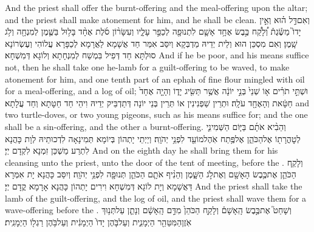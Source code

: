 {And the priest shall offer the burnt-offering and the meal-offering upon the altar; and the priest shall make atonement for him, and he shall be clean.}{}
{וְאִם\maqqaf דַּ֣ל ה֗וּא וְאֵ֣ין יָדוֹ֮ מַשֶּׂ֒גֶת֒ וְ֠לָקַ֠ח כֶּ֣בֶשׂ אֶחָ֥ד אָשָׁ֛ם לִתְנוּפָ֖ה לְכַפֵּ֣ר עָלָ֑יו וְעִשָּׂר֨וֹן סֹ֜לֶת אֶחָ֨ד בָּל֥וּל בַּשֶּׁ֛מֶן לְמִנְחָ֖ה וְלֹ֥ג שָֽׁמֶן׃}
{וְאִם מִסְכֵּן הוּא וְלֵית יְדֵיהּ מַדְבְּקָא וְיִסַּב אִמַּר חַד אֲשָׁמָא לַאֲרָמָא לְכַפָּרָא עֲלוֹהִי וְעֶשְׂרוֹנָא סוּלְתָּא חַד דְּפִיל בִּמְשַׁח לְמִנְחָתָא וְלוֹגָא דְּמִשְׁחָא׃}
{And if he be poor, and his means suffice not, then he shall take one he-lamb for a guilt-offering to be waved, to make atonement for him, and one tenth part of an ephah of fine flour mingled with oil for a meal-offering, and a log of oil;}{}
{וּשְׁתֵּ֣י תֹרִ֗ים א֤וֹ שְׁנֵי֙ בְּנֵ֣י יוֹנָ֔ה אֲשֶׁ֥ר תַּשִּׂ֖יג יָד֑וֹ וְהָיָ֤ה אֶחָד֙ חַטָּ֔את וְהָאֶחָ֖ד עֹלָֽה׃}
{וּתְרֵין שַׁפְנִינִין אוֹ תְּרֵין בְּנֵי יוֹנָה דְּתַדְבֵּיק יְדֵיהּ וִיהֵי חַד חַטָּתָא וְחַד עֲלָתָא׃}
{and two turtle-doves, or two young pigeons, such as his means suffice for; and the one shall be a sin-offering, and the other a burnt-offering.}{}
{וְהֵבִ֨יא אֹתָ֜ם בַּיּ֧וֹם הַשְּׁמִינִ֛י לְטׇהֳרָת֖וֹ אֶל\maqqaf הַכֹּהֵ֑ן אֶל\maqqaf פֶּ֥תַח אֹֽהֶל\maqqaf מוֹעֵ֖ד לִפְנֵ֥י יְהֹוָֽה׃}
{וְיַיְתֵי יָתְהוֹן בְּיוֹמָא תְּמִינָאָה לִדְכוּתֵיהּ לְוָת כָּהֲנָא לִתְרַע מַשְׁכַּן זִמְנָא לִקְדָם יְיָ׃}
{And on the eighth day he shall bring them for his cleansing unto the priest, unto the door of the tent of meeting, before the \lord.}{}
{וְלָקַ֧ח הַכֹּהֵ֛ן אֶת\maqqaf כֶּ֥בֶשׂ הָאָשָׁ֖ם וְאֶת\maqqaf לֹ֣ג הַשָּׁ֑מֶן וְהֵנִ֨יף אֹתָ֧ם הַכֹּהֵ֛ן תְּנוּפָ֖ה לִפְנֵ֥י יְהֹוָֽה׃}
{וְיִסַּב כָּהֲנָא יָת אִמְּרָא דַּאֲשָׁמָא וְיָת לוֹגָא דְּמִשְׁחָא וִירִים יָתְהוֹן כָּהֲנָא אָרָמָא קֳדָם יְיָ׃}
{And the priest shall take the lamb of the guilt-offering, and the log of oil, and the priest shall wave them for a wave-offering before the \lord.}{}
{וְשָׁחַט֮ אֶת\maqqaf כֶּ֣בֶשׂ הָֽאָשָׁם֒ וְלָקַ֤ח הַכֹּהֵן֙ מִדַּ֣ם הָֽאָשָׁ֔ם וְנָתַ֛ן עַל\maqqaf תְּנ֥וּךְ אֹֽזֶן\maqqaf הַמִּטַּהֵ֖ר הַיְמָנִ֑ית וְעַל\maqqaf בֹּ֤הֶן יָדוֹ֙ הַיְמָנִ֔ית וְעַל\maqqaf בֹּ֥הֶן רַגְל֖וֹ הַיְמָנִֽית׃}
